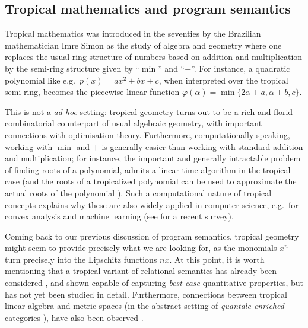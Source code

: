 \subsection{Tropical mathematics and program semantics } 


Tropical mathematics was introduced in the seventies by the Brazilian mathematician Imre Simon \cite{Simon} as the study of algebra and geometry where one replaces the usual ring structure of numbers based on addition and multiplication by the semi-ring structure given by ``$\min$'' and ``$+$''.
%
%
For instance, a quadratic polynomial like e.g.~$p(x)=ax^{2}+bx+c$, when interpreted over the tropical semi-ring, becomes the piecewise linear function
$
\varphi(\alpha)=\min\{2\alpha + a, \alpha+b, c\}
$.

This is not a \emph{ad-hoc} setting: tropical geometry turns out to be a rich and florid combinatorial counterpart of usual algebraic geometry, with important connections with optimisation theory.
Furthermore, computationally speaking, working with $\min$ and $+$ is generally easier than working with standard addition and multiplication; for instance, the important and generally intractable problem of finding roots of a polynomial, admits a linear time algorithm in the tropical case (and the roots of a tropicalized polynomial can be used to approximate the actual roots of the polynomial \cite{Noferini2015}).
Such a computational nature of tropical concepts explains why these are also widely applied in computer science, e.g.~for convex analysis and machine learning (see \cite{Maragos2021} for a recent survey).

Coming back to our previous discussion of program semantics, tropical geometry might seem to provide precisely what we are looking for, as the monomials $x^{n}$ turn precisely into the Lipschitz functions $nx$.
At this point, it is worth mentioning that a tropical variant of relational semantics has already been considered \cite{Manzo2013}, and shown capable of capturing \emph{best-case} quantitative properties, but has not yet been studied in detail. Furthermore, connections between tropical linear algebra and metric spaces (in the abstract setting of \emph{quantale-enriched} categories \cite{Hofmann2014, Stubbe2014}), have also been observed \cite{Fuji}.

